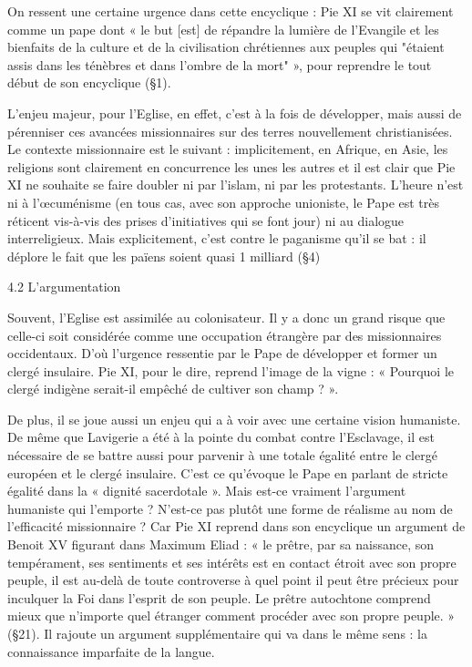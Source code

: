 On ressent une certaine urgence dans cette encyclique : Pie XI se vit clairement comme un pape dont « le but [est] de répandre la lumière de l’Evangile et les bienfaits de la culture et de la civilisation chrétiennes aux peuples qui "étaient assis dans les ténèbres et dans l’ombre de la mort" », pour reprendre le tout début de son encyclique (§1).  

L’enjeu majeur, pour l’Eglise, en effet, c’est à la fois de développer, mais aussi de pérenniser ces avancées missionnaires sur des terres nouvellement christianisées. 
Le contexte missionnaire est le suivant : implicitement, en Afrique, en Asie,  les religions sont clairement en concurrence les unes les autres et il est clair que Pie XI ne souhaite se faire doubler ni par l’islam, ni par les protestants. L’heure n’est ni à l’œcuménisme (en tous cas, avec son approche unioniste, le Pape est très réticent vis-à-vis des prises d’initiatives qui se font jour) ni au dialogue interreligieux. Mais explicitement, c’est contre le paganisme qu’il se bat : il déplore le fait que les païens soient quasi 1 milliard (§4)

4.2	 L’argumentation 

Souvent, l’Eglise est assimilée au colonisateur. Il y a donc un grand risque que celle-ci soit considérée comme une occupation étrangère par des missionnaires occidentaux. D’où l’urgence ressentie par le Pape de développer et former un clergé insulaire. Pie XI, pour le dire, reprend l’image de la vigne : « Pourquoi le clergé indigène serait-il empêché de cultiver son champ ? ». 

De plus, il se joue aussi un enjeu qui a à voir avec une certaine vision humaniste. De même que Lavigerie a été à la pointe du combat contre l’Esclavage, il est nécessaire de se battre aussi pour parvenir à une totale égalité entre le clergé européen et le clergé insulaire. C’est ce qu’évoque le Pape en parlant de stricte égalité dans la « dignité sacerdotale ».  Mais est-ce vraiment l’argument humaniste qui l'emporte ? N'est-ce pas plutôt une forme de réalisme au nom de l’efficacité missionnaire ? 
Car Pie XI reprend dans son encyclique un argument de Benoit XV figurant dans Maximum Eliad : « le prêtre, par sa naissance, son tempérament, ses sentiments et ses intérêts est en contact étroit avec son propre peuple, il est au-delà de toute controverse à quel point il peut être précieux pour inculquer la Foi dans l’esprit de son peuple. Le prêtre autochtone comprend mieux que n’importe quel étranger comment procéder avec son propre peuple. » (§21). Il rajoute un argument supplémentaire qui va dans le même sens : la connaissance imparfaite de la langue.

